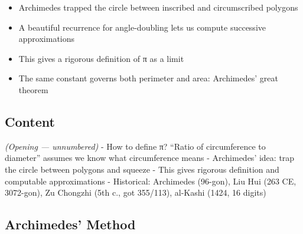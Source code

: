 \documentclass[
  10pt,
  letterpaper,
]{scrbook}
\providecommand{\tightlist}{%
  \setlength{\itemsep}{0pt}\setlength{\parskip}{0pt}}
\begin{document}
\begin{itemize}
\tightlist
\item
  Archimedes trapped the circle between inscribed and circumscribed
  polygons
\item
  A beautiful recurrence for angle-doubling lets us compute successive
  approximations
\item
  This gives a rigorous definition of π as a limit
\item
  The same constant governs both perimeter and area: Archimedes' great
  theorem
\end{itemize}

\subsection{Content}\label{content-19}

\emph{(Opening --- unnumbered)} - How to define π? ``Ratio of
circumference to diameter'' assumes we know what circumference means -
Archimedes' idea: trap the circle between polygons and squeeze - This
gives rigorous definition and computable approximations - Historical:
Archimedes (96-gon), Liu Hui (263 CE, 3072-gon), Zu Chongzhi (5th c.,
got 355/113), al-Kashi (1424, 16 digits)

\subsection{Archimedes' Method}\label{archimedes-method}
\end{document}

